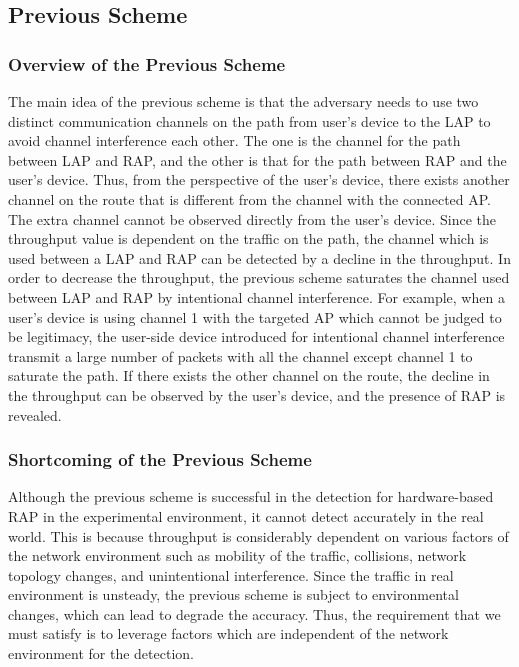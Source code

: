 \documentclass[conference]{IEEEtran}
\begin{document}
\subsection{Previous Scheme}
\subsubsection{Overview of the Previous Scheme}
The main idea of the previous scheme \cite{previous} is that the adversary needs to use two distinct communication channels on the path from user's device to the LAP to avoid channel interference each other.
The one is the channel for the path between LAP and RAP, and the other is that for the path between RAP and the user's device.
Thus, from the perspective of the user's device, there exists another channel on the route that is different from the channel with the connected AP.
The extra channel cannot be observed directly from the user's device.
Since the throughput value is dependent on the traffic on the path, the channel which is used between a LAP and RAP can be detected by a decline in the throughput.
In order to decrease the throughput, the previous scheme saturates the channel used between LAP and RAP by intentional channel interference.
For example, when a user's device is using channel 1 with the targeted AP which cannot be judged to be legitimacy, the user-side device introduced for intentional channel interference transmit a large number of packets with all the channel except channel 1 to saturate the path.
If there exists the other channel on the route, the decline in the throughput can be observed by the user's device, and the presence of RAP is revealed.

\subsubsection{Shortcoming of the Previous Scheme}
Although the previous scheme is successful in the detection for hardware-based RAP in the experimental environment, it cannot detect accurately in the real world.
This is because throughput is considerably dependent on various factors of the network environment such as mobility of the traffic, collisions, network topology changes, and unintentional interference.
Since the traffic in real environment is unsteady, the previous scheme is subject to environmental changes, which can lead to degrade the accuracy.
Thus, the requirement that we must satisfy is to leverage factors which are independent of the network environment for the detection.
\end{document}
